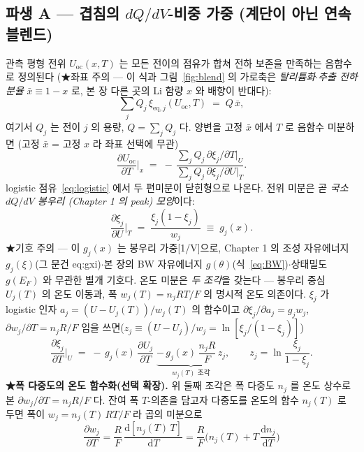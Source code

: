 \documentclass[11pt,a4paper]{article}
\newcommand{\eq}{\mathrm{eq}}
\newcommand{\oc}{\mathrm{oc}}
\begin{document}
\subsection{파생 A — 겹침의 $dQ/dV$-비중 가중 (계단이 아닌 연속 블렌드)}\label{ssec:overlap}
관측 평형 전위 $U_\oc(x,T)$ 는 모든 전이의 점유가 합쳐 전하 보존을 만족하는 음함수로 정의된다
(★좌표 주의 — 이 식과 그림~\ref{fig:blend} 의 가로축은 \emph{탈리튬화$\cdot$추출 전하 분율}
$\bar x\equiv1-x$ 로, 본 장 다른 곳의 Li 함량 $x$ 와 배향이 반대다):
\begin{equation}
\sum_j Q_j\,\xi_{\eq,j}(U_\oc,T) \;=\; Q\,\bar x,
\label{eq:implicit}
\end{equation}
여기서 $Q_j$ 는 전이 $j$ 의 용량, $Q=\sum_j Q_j$ 다. 양변을 고정 $\bar x$ 에서 $T$ 로 음함수 미분하면
(고정 $\bar x$ = 고정 $x$ 라 좌표 선택에 무관)
\begin{equation}
\frac{\partial U_\oc}{\partial T}\Big|_x
\;=\; -\,\frac{\sum_j Q_j\,\partial\xi_j/\partial T|_U}{\sum_j Q_j\,\partial\xi_j/\partial U|_T}.
\label{eq:implicit_diff}
\end{equation}
logistic 점유~\eqref{eq:logistic} 에서 두 편미분이 닫힌형으로 나온다. 전위 미분은 곧 \emph{국소 $dQ/dV$ 봉우리
(Chapter 1 의 peak) 모양}이다:
\begin{equation}
\frac{\partial\xi_j}{\partial U}\Big|_T \;=\; \frac{\xi_j(1-\xi_j)}{w_j} \;\equiv\; g_j(x).
\label{eq:gj}
\end{equation}
★기호 주의 — 이 $g_j(x)$ 는 봉우리 가중[1/V]으로, Chapter 1 의 조성 자유에너지 $g_j(\xi)$(그 문건 eq:gxi)$\cdot$본
장의 BW 자유에너지 $g(\theta)$(식~\eqref{eq:BW})$\cdot$상태밀도 $g(E_F)$ 와 무관한 별개 기호다.
온도 미분은 \emph{두 조각}을 갖는다 — 봉우리 중심 $U_j(T)$ 의 온도 이동과, 폭 $w_j(T)=n_jRT/F$ 의 명시적 온도
의존이다. $\xi_j$ 가 logistic 인자 $a_j=(U-U_j(T))/w_j(T)$ 의 함수이고 $\partial\xi_j/\partial a_j=g_j w_j$,
$\partial w_j/\partial T=n_jR/F$ 임을 쓰면($z_j\equiv(U-U_j)/w_j=\ln[\xi_j/(1-\xi_j)]$)
\begin{equation}
\frac{\partial\xi_j}{\partial T}\Big|_U
\;=\; -\,g_j(x)\,\frac{\partial U_j}{\partial T}
\;\underbrace{-\,g_j(x)\,\frac{n_jR}{F}\,z_j}_{w_j(T)\text{ 조각}},
\qquad z_j=\ln\frac{\xi_j}{1-\xi_j}.
\label{eq:dxidT}
\end{equation}
\textbf{★폭 다중도의 온도 함수화(선택 확장).} 위 둘째 조각은 폭 다중도 $n_j$ 를 온도 상수로 본 $\partial w_j/\partial T=n_jR/F$ 다.
잔여 폭 $T$-의존을 담고자 다중도를 온도의 함수 $n_j(T)$ 로 두면 폭이 $w_j=n_j(T)\,RT/F$ 라 곱의 미분으로
\begin{equation}
\frac{\partial w_j}{\partial T}=\frac{R}{F}\,\frac{\mathrm{d}[n_j(T)\,T]}{\mathrm{d}T}
=\frac{R}{F}\Big(n_j(T)+T\,\frac{\mathrm{d}n_j}{\mathrm{d}T}\Big)
\label{eq:dwdT-nT}
\end{equation}
\end{document}
